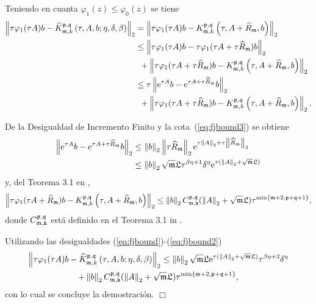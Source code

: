 Teniendo en cuanta $\varphi_1(z) \leq \varphi_0(z)$ se tiene
\begin{align}
	\left\lVert \tau \varphi_1(\tau A)b -\widehat{K}_{\mathfrak{m},k}^{\mathfrak{p},\mathfrak{q}}\left( \tau, A , b; \eta, \delta, \beta \right) \right\rVert_2 & = \left\lVert \tau \varphi_1(\tau A)b -K_{\mathfrak{m},k}^{\mathfrak{p},\mathfrak{q}}\left( \tau, A+\widehat{R}_{\mathfrak{m}} , b \right) \right\rVert_2 \nonumber \\
	& \leq \left\lVert \tau \varphi_1(\tau A)b - \tau \varphi_1(\tau A + \tau \widehat{R}_{\mathfrak{m}})b \right\rVert_2 \nonumber \\
	& \enspace + \left\lVert \tau \varphi_1(\tau A + \tau \widehat{R}_{\mathfrak{m}})b-K_{\mathfrak{m},k}^{\mathfrak{p},\mathfrak{q}}\left( \tau, A+\widehat{R}_{\mathfrak{m}} , b \right) \right\rVert_2 \nonumber\\
	& \leq \tau \left\lVert \mathrm{e}^{\tau A}b - \mathrm{e}^{\tau A + \tau \widehat{R}_{\mathfrak{m}}}b \right\rVert_2 \nonumber \\
	& \enspace + \left\lVert \tau \varphi_1(\tau A + \tau \widehat{R}_{\mathfrak{m}})b-K_{\mathfrak{m},k}^{\mathfrak{p},\mathfrak{q}}\left( \tau, A+\widehat{R}_{\mathfrak{m}} , b \right) \right\rVert_2. \label{eq:fjbound}
\end{align}

De la Desigualdad de Incremento Finito y la cota~(\ref{eq:fjbound3}) se obtiene
\begin{align}
	\left\lVert \mathrm{e}^{\tau A}b - \mathrm{e}^{\tau A + \tau \widehat{R}_{\mathfrak{m}}}b \right\rVert_2&\leq \left\lVert b \right\rVert_2 \left\lVert \tau \widehat{R}_{\mathfrak{m}} \right\rVert_2\mathrm{e}^{\tau\left\lVert A \right\rVert_2+\tau\left\lVert \widehat{R}_{\mathfrak{m}} \right\rVert_2} \\ &\leq \left\lVert b \right\rVert_2   \sqrt{\mathfrak{m}}\mathfrak{L} \tau^{\beta\eta+1}\delta^\eta\mathrm{e}^{\tau(\left\lVert A \right\rVert_2+\sqrt{\mathfrak{m}}\mathfrak{L})} \nonumber\label{eq:fjbound1}
\end{align}
y, del Teorema 3.1 en \cite{naranjo2021locally}, 
\vspace{-0.25cm}
\begin{equation}
	\left\lVert \tau \varphi_1(\tau A+\widehat{R}_{\mathfrak{m}})b-K_{\mathfrak{m},k}^{\mathfrak{p},\mathfrak{q}}\left( \tau, A+\widehat{R}_{\mathfrak{m}} , b \right) \right\rVert_2  \leq \left\lVert b \right\rVert_2C_{\mathfrak{m},\mathtt{k}}^{\mathfrak{p},\mathfrak{q}}(\left\lVert A \right\rVert_2+\sqrt{\mathfrak{m}}\mathfrak{L})\tau^{\min\{\mathfrak{m}+2,\mathfrak{p}+\mathfrak{q}+1\}}, \label{eq:fjbound2}
\end{equation}
donde $C_{\mathfrak{m},\mathtt{k}}^{\mathfrak{p},\mathfrak{q}}$ está definido en el Teorema 3.1 in \cite{naranjo2021locally}.

Utilizando las desigualdades (\ref{eq:fjbound})-(\ref{eq:fjbound2})
\vspace{-0.25cm}
\begin{multline*}
	\left\lVert \tau \varphi_1(\tau A)b -\widehat{K}_{\mathfrak{m},k}^{\mathfrak{p},\mathfrak{q}}\left( \tau, A , b; \eta, \delta, \beta \right) \right\rVert_2 \leq 
	\left\lVert b \right\rVert_2 \sqrt{\mathfrak{m}}\mathfrak{L} \mathrm{e}^{\tau(\left\lVert A \right\rVert_2+\sqrt{\mathfrak{m}}\mathfrak{L})} \tau^{\beta\eta+2}\delta^\eta \\ + \left\lVert b \right\rVert_2C_{\mathfrak{m},\mathtt{k}}^{\mathfrak{p},\mathfrak{q}}(\left\lVert A \right\rVert_2+\sqrt{\mathfrak{m}}\mathfrak{L})\tau^{\min\{\mathfrak{m}+2,\mathfrak{p}+\mathfrak{q}+1\}} ,
\end{multline*}
con lo cual se concluye la demostración. $\Box$\\

